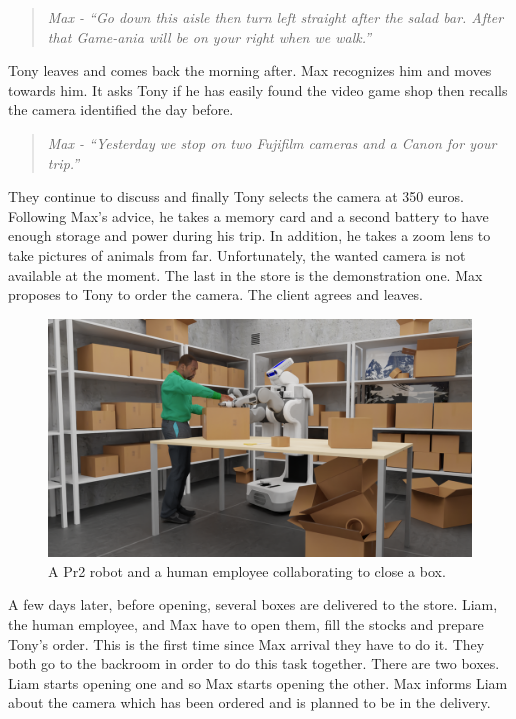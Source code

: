 \begin{quote} 
\centering 
\textit{
Max - ``Go down this aisle then turn left straight after the salad bar. After that Game-ania will be on your right when we walk.''}
\end{quote}

Tony leaves and comes back the morning after. Max recognizes him and moves towards him. It asks Tony if he has easily found the video game shop then recalls the camera identified the day before.

\begin{quote} 
\centering 
\textit{
Max - ``Yesterday we stop on two Fujifilm cameras and a Canon for your trip.''}
\end{quote}

They continue to discuss and finally Tony selects the camera at 350 euros. Following Max's advice, he takes a memory card and a second battery to have enough storage and power during his trip. In addition, he takes a zoom lens to take pictures of animals from far. Unfortunately, the wanted camera is not available at the moment. The last in the store is the demonstration one. Max proposes to Tony to order the camera. The client agrees and leaves.

\begin{figure}[ht!]
\centering
\includegraphics[width=\textwidth]{figures/introduction/camera_store_5.png}
\caption{\label{fig:cam_back} A Pr2 robot and a human employee collaborating to close a box. }
\end{figure}

A few days later, before opening, several boxes are delivered to the store. Liam, the human employee, and Max have to open them, fill the stocks and prepare Tony's order. This is the first time since Max arrival they have to do it. They both go to the backroom in order to do this task together. There are two boxes. Liam starts opening one and so Max starts opening the other. Max informs Liam about the camera which has been ordered and is planned to be in the delivery.

